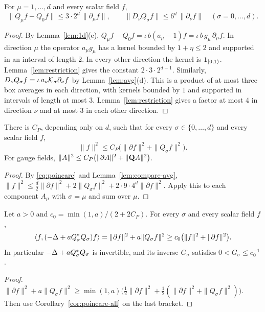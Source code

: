 \begin{lemma}\label{lem:compare-avg}
For $\mu=1,\dots,d$ and every scalar field $f$,
\[
\|Q_\mu f-Q_0f\|\le 3\cdot2^d\,\|\partial_\mu f\|,\qquad
\|D_\nu Q_\sigma f\|\le 6^d\,\|\partial_\nu f\|\quad(\sigma=0,\dots,d).
\]
\end{lemma}

\begin{proof}
By Lemma~\ref{lem:1d}(e), $Q_\mu f-Q_0f=\iota\,b(a_\mu-1)f=\iota\,b\,g_\mu\,\partial_\mu f$. In direction $\mu$ the operator $a_\mu g_\mu$ has a kernel bounded by $1+\eta\le2$ and supported in an interval of length $2$. In every other direction the kernel is $\mathbf 1_{[0,1)}$. Lemma~\ref{lem:restriction} gives the constant $2\cdot3\cdot2^{d-1}$. Similarly, $D_\nu Q_\sigma f=\iota\,a_\nu\mathcal K_\sigma\partial_\nu f$ by Lemma~\ref{lem:avg}(d). This is a product of at most three box averages in each direction, with kernels bounded by $1$ and supported in intervals of length at most $3$. Lemma~\ref{lem:restriction} gives a factor at most $4$ in direction $\nu$ and at most $3$ in each other direction.
\end{proof}

\begin{corollary}\label{cor:poincare-all}
There is $C_P$, depending only on $d$, such that for every $\sigma\in\{0,\dots,d\}$ and every scalar field $f$,
\[
\|f\|^2\le C_P\big(\|\partial f\|^2+\|Q_\sigma f\|^2\big).
\]
For gauge fields, $\|A\|^2\le C_P\big(\|\partial A\|^2+\|\mathbf Q A\|^2\big)$.
\end{corollary}

\begin{proof}
By \eqref{eq:poincare} and Lemma~\ref{lem:compare-avg}, $\|f\|^2\le\frac d2\|\partial f\|^2+2\|Q_\sigma f\|^2+2\cdot9\cdot4^d\|\partial f\|^2$. Apply this to each component $A_\mu$ with $\sigma=\mu$ and sum over $\mu$.
\end{proof}

\begin{corollary}\label{cor:scalar-coercive}
Let $a>0$ and $c_0=\min(1,a)/(2+2C_P)$. For every $\sigma$ and every scalar field $f$,
\[
\langle f,(-\Delta+aQ_\sigma^*Q_\sigma)f\rangle=\|\partial f\|^2+a\|Q_\sigma f\|^2\ge c_0\big(\|f\|^2+\|\partial f\|^2\big).
\]
In particular $-\Delta+aQ_\sigma^*Q_\sigma$ is invertible, and its inverse $G_\sigma$ satisfies $0<G_\sigma\le c_0^{-1}$.
\end{corollary}

\begin{proof}
$\|\partial f\|^2+a\|Q_\sigma f\|^2\ge\min(1,a)\big(\frac12\|\partial f\|^2+\frac12(\|\partial f\|^2+\|Q_\sigma f\|^2)\big)$. Then use Corollary~\ref{cor:poincare-all} on the last bracket.
\end{proof}

